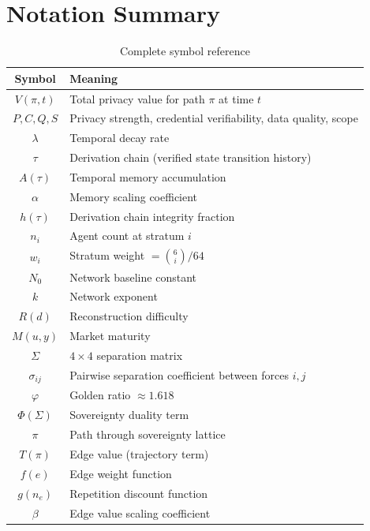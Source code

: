 \documentclass[11pt,a4paper]{article}
\begin{document}
\section{Notation Summary}

\begin{table}[h]
\centering
\small
\caption{Complete symbol reference}
\begin{tabular}{@{}cl@{}}
\toprule
\textbf{Symbol} & \textbf{Meaning} \\
\midrule
$V(\pi, t)$ & Total privacy value for path $\pi$ at time $t$ \\
$P, C, Q, S$ & Privacy strength, credential verifiability, data quality, scope \\
$\lambda$ & Temporal decay rate \\
$\tau$ & Derivation chain (verified state transition history) \\
$A(\tau)$ & Temporal memory accumulation \\
$\alpha$ & Memory scaling coefficient \\
$h(\tau)$ & Derivation chain integrity fraction \\
$n_i$ & Agent count at stratum $i$ \\
$w_i$ & Stratum weight $= \binom{6}{i}/64$ \\
$N_0$ & Network baseline constant \\
$k$ & Network exponent \\
$R(d)$ & Reconstruction difficulty \\
$M(u,y)$ & Market maturity \\
$\Sigma$ & $4 \times 4$ separation matrix \\
$\sigma_{ij}$ & Pairwise separation coefficient between forces $i, j$ \\
$\varphi$ & Golden ratio $\approx 1.618$ \\
$\Phi(\Sigma)$ & Sovereignty duality term \\
$\pi$ & Path through sovereignty lattice \\
$T(\pi)$ & Edge value (trajectory term) \\
$f(e)$ & Edge weight function \\
$g(n_e)$ & Repetition discount function \\
$\beta$ & Edge value scaling coefficient \\
\bottomrule
\end{tabular}
\end{table}
\end{document}
